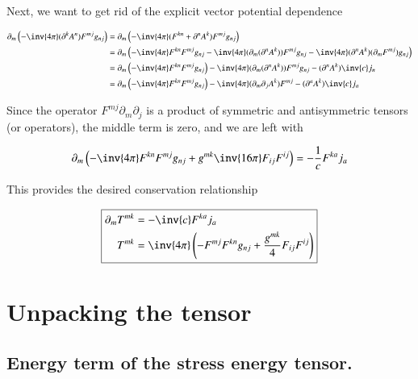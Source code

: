 Next, we want to get rid of the explicit vector potential dependence

\begin{align*}
\partial_m \left( -\inv{4 \pi } (\partial^k A^n )F^{m j} g_{n j} \right)
&=
\partial_m \left( -\inv{4 \pi } (F^{k n} + \partial^n A^k )F^{m j} g_{n j} \right) \\
&=
\partial_m \left( -\inv{4 \pi } F^{k n} F^{m j} g_{n j} 
- \inv{4 \pi} (\partial_m (\partial^n A^k )) F^{m j} g_{n j} 
- \inv{4 \pi} (\partial^n A^k ) (\partial_m F^{m j}) g_{n j} \right) \\
&=
\partial_m \left( -\inv{4 \pi } F^{k n} F^{m j} g_{n j} \right)
- \inv{4 \pi} (\partial_m (\partial^n A^k )) F^{m j} g_{n j} 
- (\partial^n A^k ) \inv{c} j_n \\
&=
\partial_m \left( -\inv{4 \pi } F^{k n} F^{m j} g_{n j} \right)
- \inv{4 \pi} (\partial_m \partial_j A^k ) F^{m j} 
- (\partial^a A^k ) \inv{c} j_a \\
\end{align*}

Since the operator $F^{m j} \partial_m \partial_j$ is a product of symmetric and antisymmetric tensors (or operators), the middle term is zero, and we are left with

\begin{equation}\label{eqn:relativisticElectrodynamicsL23:70}
\partial_m \left(
-\inv{4 \pi } F^{k n} F^{m j} g_{n j} 
+ g^{m k} \inv{16 \pi } F_{i j} F^{i j} 
\right)
= 
- \frac{1}{c} F^{k a} j_a
\end{equation}

This provides the desired conservation relationship

\begin{equation}\label{eqn:relativisticElectrodynamicsL23:90}
\boxed{
\begin{aligned}
\partial_m T^{m k} &= - \inv{c} F^{k a} j_a \\
T^{m k} &=
\inv{4 \pi } \left(
-
F^{m j} 
F^{k n} 
g_{n j} 
+ \frac{g^{m k}}{4} F_{i j} F^{i j} \right)
\end{aligned}
}
\end{equation}

\section{Unpacking the tensor}

\subsection{Energy term of the stress energy tensor.}

